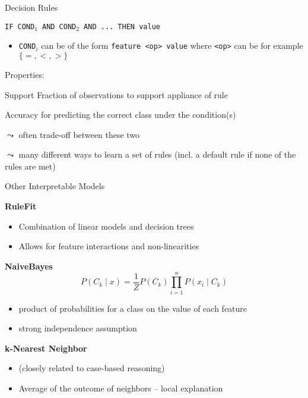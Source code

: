 \documentclass[aspectratio=169]{../latex_main/tntbeamer}  %
\begin{document}

\begin{frame}[c]{Decision Rules}

\texttt{IF COND$_1$ AND COND$_2$ AND ... THEN value}

\begin{itemize}
    \item \texttt{COND$_i$} can be of the form \texttt{feature <op> value} where \texttt{<op>} can be for example $\{=, <, > \}$
\end{itemize}

\pause
\medskip

Properties:
\begin{description}
    \item{Support} Fraction of observations to support appliance of rule
    \item{Accuracy} for predicting the correct class under the condition(s)
\end{description}

$\leadsto$ often trade-off between these two

\pause
\medskip

$\leadsto$ many different ways to learn a set of rules (incl. a default rule if none of the rules are met)

\end{frame}


\begin{frame}[c]{Other Interpretable Models}

\textbf{RuleFit} 
\begin{itemize}
    \item Combination of linear models and decision trees 
    \item Allows for feature interactions and non-linearities
\end{itemize}

\textbf{NaiveBayes}
$$P (C_k \mid x ) = \frac{1}{Z} P(C_k) \prod_{i=1}^{n} P(x_i \mid C_k) $$
\begin{itemize}
    \item product of probabilities for a class on the value of each feature
    \item strong independence assumption
\end{itemize}


\textbf{k-Nearest Neighbor}
\begin{itemize}
    \item (closely related to case-based reasoning)
    \item Average of the outcome of neighbors -- local explanation
\end{itemize}

\end{frame}
	
\end{document}

